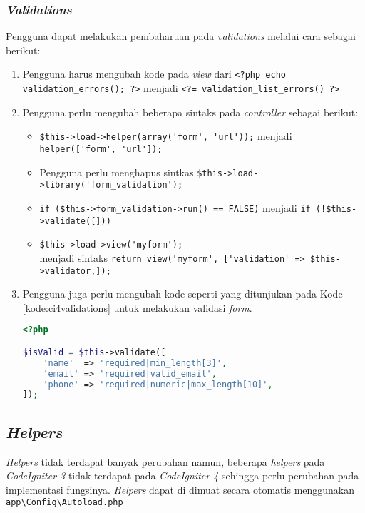 \subsubsection{\textit{Validations}}
Pengguna dapat melakukan pembaharuan pada \textit{validations} melalui cara sebagai berikut:
\begin{enumerate}
\item Pengguna harus mengubah kode pada \textit{view} dari \verb|<?php echo validation_errors(); ?>| menjadi \verb|<?= validation_list_errors() ?>|
\item Pengguna perlu mengubah beberapa sintaks pada \textit{controller} sebagai berikut:
	\begin{itemize}
		\item \verb|$this->load->helper(array('form', 'url'));| menjadi \verb|helper(['form', 'url']);|
		\item Pengguna perlu menghapus sintkas \verb|$this->load->library('form_validation');|
		\item \verb|if ($this->form_validation->run() == FALSE)| menjadi \verb|if (!$this->validate([]))|
		\item \verb|$this->load->view('myform');| \\ menjadi sintaks  \verb|return view('myform', ['validation' => $this->validator,]);|
	\end{itemize}
	\item Pengguna juga perlu mengubah kode seperti yang ditunjukan pada Kode \ref{kode:ci4validations} untuk melakukan validasi \textit{form}.
	\begin{lstlisting}[language=PHP, caption=Perubahan kode untuk melakukan validasi. ,label=kode:ci4validations]
<?php

$isValid = $this->validate([
    'name'  => 'required|min_length[3]',
    'email' => 'required|valid_email',
    'phone' => 'required|numeric|max_length[10]',
]);
\end{lstlisting}
\end{enumerate}

\subsection{\textit{Helpers}}
 
\textit{Helpers} tidak terdapat banyak perubahan namun, beberapa \textit{helpers} pada \textit{CodeIgniter 3} tidak terdapat pada \textit{CodeIgniter 4} sehingga perlu perubahan pada implementasi fungsinya. \textit{Helpers} dapat di dimuat secara otomatis menggunakan \verb|app\Config\Autoload.php|

